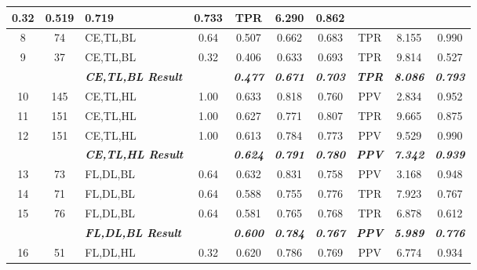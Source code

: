 \begin{table}[H]
{\begin{tabular}{cc|l|c|c|c|c|c|c|c|}
    0.32 &
    0.519 &
    0.719 &
    0.733 &
    TPR &
    6.290 &
    0.862 \\ \hline
  \multicolumn{1}{|c|}{8} &
    74 &
    CE,TL,BL &
    0.64 &
    0.507 &
    0.662 &
    0.683 &
    TPR &
    8.155 &
    0.990 \\ \hline
  \multicolumn{1}{|c|}{9} &
    37 &
    CE,TL,BL &
    0.32 &
    0.406 &
    0.633 &
    0.693 &
    TPR &
    9.814 &
    0.527 \\ \hline
   &
     &
    \textit{\textbf{CE,TL,BL Result}} &
     &
    \textit{\textbf{0.477}} &
    \textit{\textbf{0.671}} &
    \textit{\textbf{0.703}} &
    \textit{\textbf{TPR}} &
    \textit{\textbf{8.086}} &
    \textit{\textbf{0.793}} \\ \hline
  \multicolumn{1}{|c|}{10} &
    145 &
    CE,TL,HL &
    1.00 &
    0.633 &
    0.818 &
    0.760 &
    PPV &
    2.834 &
    0.952 \\ \hline
  \multicolumn{1}{|c|}{11} &
    151 &
    CE,TL,HL &
    1.00 &
    0.627 &
    0.771 &
    0.807 &
    TPR &
    9.665 &
    0.875 \\ \hline
  \multicolumn{1}{|c|}{12} &
    151 &
    CE,TL,HL &
    1.00 &
    0.613 &
    0.784 &
    0.773 &
    PPV &
    9.529 &
    0.990 \\ \hline
   &
     &
    \textit{\textbf{CE,TL,HL Result}} &
     &
    \textit{\textbf{0.624}} &
    \textit{\textbf{0.791}} &
    \textit{\textbf{0.780}} &
    \textit{\textbf{PPV}} &
    \textit{\textbf{7.342}} &
    \textit{\textbf{0.939}} \\ \hline
  \multicolumn{1}{|c|}{13} &
    73 &
    FL,DL,BL &
    0.64 &
    0.632 &
    0.831 &
    0.758 &
    PPV &
    3.168 &
    0.948 \\ \hline
  \multicolumn{1}{|c|}{14} &
    71 &
    FL,DL,BL &
    0.64 &
    0.588 &
    0.755 &
    0.776 &
    TPR &
    7.923 &
    0.767 \\ \hline
  \multicolumn{1}{|c|}{15} &
    76 &
    FL,DL,BL &
    0.64 &
    0.581 &
    0.765 &
    0.768 &
    TPR &
    6.878 &
    0.612 \\ \hline
   &
     &
    \textit{\textbf{FL,DL,BL Result}} &
     &
    \textit{\textbf{0.600}} &
    \textit{\textbf{0.784}} &
    \textit{\textbf{0.767}} &
    \textit{\textbf{PPV}} &
    \textit{\textbf{5.989}} &
    \textit{\textbf{0.776}} \\ \hline
  \multicolumn{1}{|c|}{16} &
    51 &
    FL,DL,HL &
    0.32 &
    0.620 &
    0.786 &
    0.769 &
    PPV &
    6.774 &
    0.934 \\ \hline

\end{tabular}}
\end{table}
